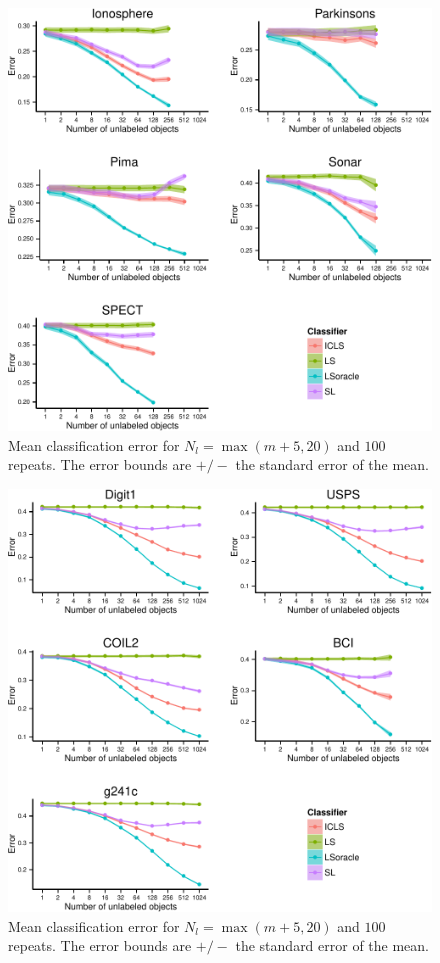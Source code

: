 \documentclass{elsarticle}
\begin{document}
\begin{figure}[ht!] 
  \centering
      \includegraphics[width=1.0\textwidth]{LearningCurves-1.pdf}
  \caption{Mean classification error for $N_l=\max(m+5,20)$ and $100$ repeats. The error bounds are $+/-$ the standard error of the mean.} \label{fig:learningcurves1}
\end{figure}

\begin{figure}[ht!] 
  \centering
      \includegraphics[width=1.0\textwidth]{LearningCurves-2.pdf}
  \caption{Mean classification error for $N_l=\max(m+5,20)$ and $100$ repeats. The error bounds are $+/-$ the standard error of the mean.} \label{fig:learningcurves2}
\end{figure}
\end{document}
